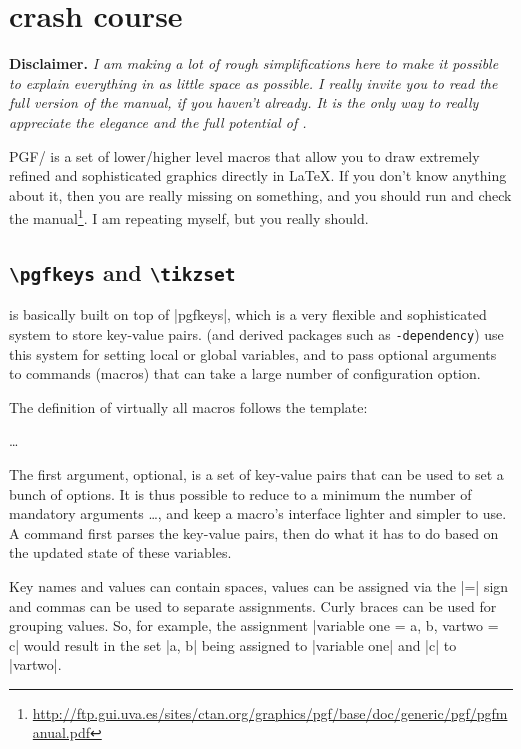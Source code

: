 \documentclass[a4paper]{ltxdoc}
\newcommand{\cmdname}[1]{\texttt{\color{red!75!black}\detokenize{#1}}}
\def\pkgname{\tikzname{}\texttt{-dependency}}
\newcommand{\options}[1][key-value-pairs]{\opt{\oarg{#1}}}
\begin{document}
\appendix

\section{\tikzname{} crash course} \label{sec:tikz}

\textbf{Disclaimer.} \textit{I am making a lot of rough simplifications here to make it possible to explain everything in as little space as possible. I really invite you to read the full version of the manual, if you haven't already. It is the only way to really appreciate the elegance and the full potential of \tikzname{}.}

\vspace{1cm}

PGF/\tikzname{} is a set of lower/higher level macros that allow you to draw extremely refined and sophisticated graphics directly in \LaTeX{}. If you don't know anything about it, then you are really missing on something, and you should run and check the manual\footnote{\url{http://ftp.gui.uva.es/sites/ctan.org/graphics/pgf/base/doc/generic/pgf/pgfmanual.pdf}}. I am repeating myself, but you really should.

\subsection{\texttt{\textbackslash pgfkeys} and \texttt{\textbackslash tikzset}}

\tikzname{} is basically built on top of |pgfkeys|, which is a very flexible and sophisticated system to store key-value pairs. \tikzname{} (and derived packages such as \pkgname{}) use this system for setting local or global variables, and to pass optional arguments to commands (macros) that can take a large number of configuration option. 

The definition of virtually all \tikzname{} macros follows the template:

\cmdname\somecommand\options{}\dots{}

The first argument, optional, is a set of key-value pairs that can be used to set a bunch of options. It is thus possible to reduce to a minimum the number of mandatory arguments \dots{}, and keep a macro's interface lighter and simpler to use. A command first parses the key-value pairs, then do what it has to do based on the updated state of these variables.

Key names and values can contain spaces, values can be assigned via the |=| sign and commas can be used to separate assignments. Curly braces can be used for grouping values. So, for example, the assignment |variable one = {a, b}, vartwo = c| would result in the set |{a, b}| being assigned to |variable one| and |c| to |vartwo|.
\end{document}
